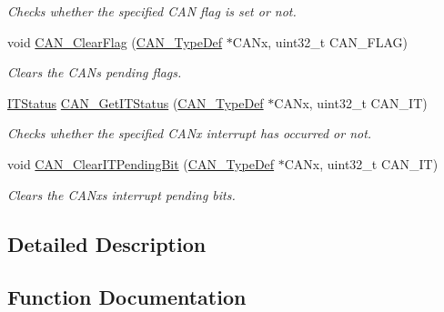 \begin{DoxyCompactItemize}
\begin{DoxyCompactList}\small\item\em Checks whether the specified C\+AN flag is set or not. \end{DoxyCompactList}\item 
void \hyperlink{group___c_a_n___exported___functions_ga2c01646d5d3a2d7045e8dd71f58f8742}{C\+A\+N\+\_\+\+Clear\+Flag} (\hyperlink{struct_c_a_n___type_def}{C\+A\+N\+\_\+\+Type\+Def} $\ast$C\+A\+Nx, uint32\+\_\+t C\+A\+N\+\_\+\+F\+L\+AG)
\begin{DoxyCompactList}\small\item\em Clears the C\+AN\textquotesingle{}s pending flags. \end{DoxyCompactList}\item 
\hyperlink{group___exported__types_gaacbd7ed539db0aacd973a0f6eca34074}{I\+T\+Status} \hyperlink{group___c_a_n___exported___functions_ga9aca05b3013e1b3438f3559f80b33c82}{C\+A\+N\+\_\+\+Get\+I\+T\+Status} (\hyperlink{struct_c_a_n___type_def}{C\+A\+N\+\_\+\+Type\+Def} $\ast$C\+A\+Nx, uint32\+\_\+t C\+A\+N\+\_\+\+IT)
\begin{DoxyCompactList}\small\item\em Checks whether the specified C\+A\+Nx interrupt has occurred or not. \end{DoxyCompactList}\item 
void \hyperlink{group___c_a_n___exported___functions_ga30bf7ac0c1793f6622a4a1adbb7dbc8a}{C\+A\+N\+\_\+\+Clear\+I\+T\+Pending\+Bit} (\hyperlink{struct_c_a_n___type_def}{C\+A\+N\+\_\+\+Type\+Def} $\ast$C\+A\+Nx, uint32\+\_\+t C\+A\+N\+\_\+\+IT)
\begin{DoxyCompactList}\small\item\em Clears the C\+A\+Nx\textquotesingle{}s interrupt pending bits. \end{DoxyCompactList}\end{DoxyCompactItemize}


\subsection{Detailed Description}


\subsection{Function Documentation}
\mbox{\label{group___c_a_n___exported___functions_ga81106cdf5395a1947bfc87ec1685829e}} 
